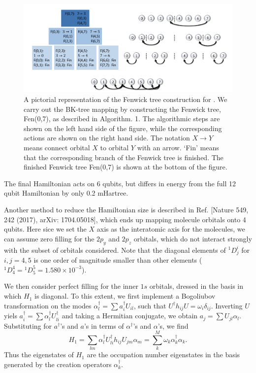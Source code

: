 \documentclass[11pt, oneside]{article}   	%
\begin{document}
\begin{figure}
\includegraphics[width=\linewidth]{figs/1808_10402_BKtree.png}
\caption{A pictorial representation of the Fenwick tree construction for . We carry out the BK-tree mapping by constructing the Fenwick tree, Fen(0,7), as described in Algorithm. 1. The algorithmic steps are shown on the left hand side of the figure, while the corresponding actions are shown on the right hand side. The notation $X \to Y$ means connect orbital $X$ to orbital $Y$ with an arrow. `Fin' means that the corresponding branch of the Fenwick tree is finished. The finished Fenwick tree Fen(0,7) is shown at the bottom of the figure.}
\label{fig:BKtree}
\end{figure}

The final Hamiltonian acts on 6 qubits, but differs in energy from the full 12 qubit Hamiltonian by only 0.2 mHartree.

Another method to reduce the Hamiltonian size is described in Ref. [Nature 549, 242 (2017), arXiv: 1704.05018], which ends up mapping  molecule orbitals onto 4 qubits.
Here sice we set the $X$ axis as the interatomic axis for the  molecules, we can assume zero filling for the $2p_y$ and $2p_z$ orbitals, which do not interact strongly with the subset of orbitals considered. 
Note that the diagonal elements of ${}^1 D^i_j$ for $i, j = 4, 5$ is one order of magnitude smaller than other elements (${}^1 D^4_4 = {}^1 D^5_5 = 1.580 \times 10^{-3}$).

We then consider perfect filling for the inner $1s$ orbitals, dressed in the basis in which $H_1$ is diagonal. 
To this extent, we first implement a Bogoliubov transformation on the modes $\alpha^{\dagger}_l = \sum a^{\dagger}_i U_{il} $, such that $U^{\dagger} h_{ij} U = \omega_i \delta_{ij}$.
Inverting $U$ yiels 
$a^{\dagger}_i =  \sum \alpha^{\dagger}_l U^{\dagger}_{li} $ 
and taking a Hermitian conjugate, we obtain 
$a_j =  \sum U_{jl} \alpha_l $.
Substituting for $a^{\dagger}$'s and $a$'s in terms of $\alpha^{\dagger}$'s and $\alpha$'s, we find
\begin{equation}
H_1 = \sum_{lm} \alpha^{\dagger}_l U^{\dagger}_{li} h_{ij} U_{jm} \alpha_m = \sum^M_{k} \omega_k \alpha^{\dagger}_k \alpha_k.
\end{equation}
Thus the eigenstates of $H_1$ are the occupation number eigenstates in the basis generated by the creation operators $\alpha^{\dagger}_k$.
\end{document}
